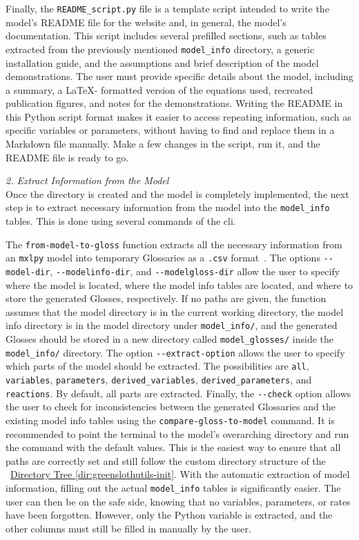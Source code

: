 Finally, the \verb|README_script.py| file is a template script intended to write the model's README file for the \greensloth{} website and, in general, the model's documentation. This script includes several prefilled sections, such as tables extracted from the previously mentioned \verb|model_info| directory, a generic installation guide, and the assumptions and brief description of the model demonstrations. The user must provide specific details about the model, including a summary, a \LaTeX{}- formatted version of the equations used, recreated publication figures, and notes for the demonstrations. Writing the README in this Python script format makes it easier to access repeating information, such as specific variables or parameters, without having to find and replace them in a Markdown file manually. Make a few changes in the script, run it, and the README file is ready to go.

\emph{2. Extract Information from the Model}\\
Once the directory is created and the model is completely implemented, the next step is to extract necessary information from the model into the \verb|model_info| tables. This is done using several commands of the \greensloth[GreenSlothUtils] \gls{cli}.

The \verb|from-model-to-gloss| function extracts all the necessary information from an \verb|mxlpy| model into temporary Glossaries as a \verb|.csv| format~. The options \verb|--model-dir|, \verb|--modelinfo-dir|, and \verb|--modelgloss-dir| allow the user to specify where the model is located, where the model info tables are located, and where to store the generated Glosses, respectively. If no paths are given, the function assumes that the model directory is in the current working directory, the model info directory is in the model directory under \verb|model_info/|, and the generated Glosses should be stored in a new directory called \verb|model_glosses/| inside the \verb|model_info/| directory. The option \verb|--extract-option| allows the user to specify which parts of the model should be extracted. The possibilities are \texttt{all}, \texttt{variables}, \texttt{parameters}, \texttt{derived\_variables}, \texttt{derived\_parameters}, and \texttt{reactions}. By default, all parts are extracted. Finally, the \verb|--check| option allows the user to check for inconsistencies between the generated Glossaries and the existing model info tables using the \verb|compare-gloss-to-model| command. It is recommended to point the terminal to the model's overarching directory and run the command with the default values. This is the easiest way to ensure that all paths are correctly set and still follow the custom directory structure of the \greensloth{}~\hyperref[dir:greenslothutils-init]{Directory Tree \ref*{dir:greenslothutils-init}}. With the automatic extraction of model information, filling out the actual \verb|model_info| tables is significantly easier. The user can then be on the safe side, knowing that no variables, parameters, or rates have been forgotten. However, only the Python variable is extracted, and the other columns must still be filled in manually by the user.

